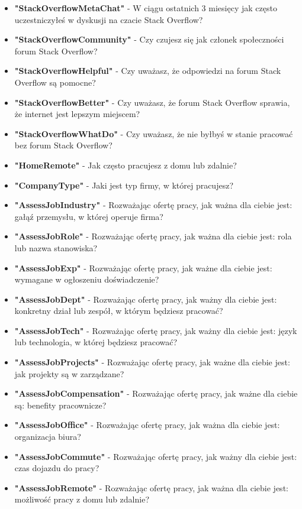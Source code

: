 \begin{appendices}
\begin{itemize}
        \item \textbf{"StackOverflowMetaChat"} - W ciągu ostatnich 3 miesięcy jak często uczestniczyłeś w dyskusji na czacie Stack Overflow?
        \item \textbf{"StackOverflowCommunity"} - Czy czujesz się jak członek społeczności forum Stack Overflow?
        \item \textbf{"StackOverflowHelpful"} - Czy uważasz, że odpowiedzi na forum Stack Overflow są pomocne?
        \item \textbf{"StackOverflowBetter"} - Czy uważasz, że forum Stack Overflow sprawia, że internet jest lepszym miejscem?
        \item \textbf{"StackOverflowWhatDo"} - Czy uważasz, że nie byłbyś w stanie pracować bez forum Stack Overflow?
        \item \textbf{"HomeRemote"} - Jak często pracujesz z domu lub zdalnie?
        \item \textbf{"CompanyType"} - Jaki jest typ firmy, w której pracujesz?
        \item \textbf{"AssessJobIndustry"} - Rozważając ofertę pracy, jak ważna dla ciebie jest: gałąź przemysłu, w której operuje firma?
        \item \textbf{"AssessJobRole"} - Rozważając ofertę pracy, jak ważna dla ciebie jest: rola lub nazwa stanowiska?
        \item \textbf{"AssessJobExp"} - Rozważając ofertę pracy, jak ważne dla ciebie jest: wymagane w ogłoszeniu doświadczenie?
        \item \textbf{"AssessJobDept"} - Rozważając ofertę pracy, jak ważny dla ciebie jest: konkretny dział lub zespół, w którym będziesz pracować?
        \item \textbf{"AssessJobTech"} - Rozważając ofertę pracy, jak ważny dla ciebie jest: język lub technologia, w której będziesz pracować?
        \item \textbf{"AssessJobProjects"} - Rozważając ofertę pracy, jak ważne dla ciebie jest: jak projekty są w zarządzane?
        \item \textbf{"AssessJobCompensation"} - Rozważając ofertę pracy, jak ważne dla ciebie są: benefity pracownicze?
        \item \textbf{"AssessJobOffice"} - Rozważając ofertę pracy, jak ważna dla ciebie jest: organizacja biura?
        \item \textbf{"AssessJobCommute"} - Rozważając ofertę pracy, jak ważny dla ciebie jest: czas dojazdu do pracy?
        \item \textbf{"AssessJobRemote"} - Rozważając ofertę pracy, jak ważna dla ciebie jest: możliwość pracy z domu lub zdalnie?

\end{itemize}
\end{appendices}
